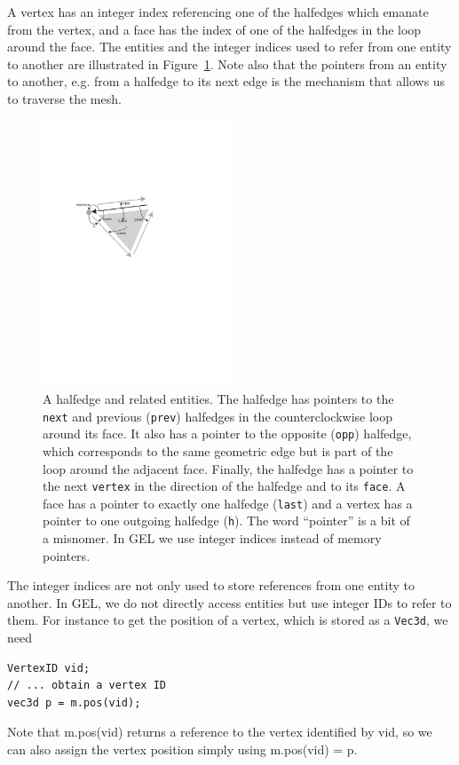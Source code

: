 \documentclass[a4paper]{article}
\begin{document}
A vertex has an integer index referencing one of the halfedges which emanate from the vertex, and a face has the index of one of the halfedges in the loop around the face. The entities and the integer indices used to refer from one entity to another are illustrated in Figure~\ref{fig:halfedge}. Note also that the pointers from an entity to another, e.g. from a halfedge to its next edge is the mechanism that allows us to traverse the mesh.
\begin{figure}[h!]
\centering
\includegraphics[width=0.5\textwidth]{halfedge-entities.pdf}
\caption{A halfedge and related entities. The halfedge has pointers to the \texttt{next} and previous (\texttt{prev}) halfedges in the counterclockwise loop around its face. It also has a pointer to the opposite (\texttt{opp}) halfedge, which corresponds to the same geometric edge but is part of the loop around the adjacent face. Finally, the halfedge has a pointer to the next \texttt{vertex} in the direction of the halfedge and to its \texttt{face}. A face has a pointer to exactly one halfedge (\texttt{last}) and a vertex has a pointer to one outgoing halfedge (\texttt{h}). The word ``pointer'' is a bit of a misnomer. In GEL we use integer indices instead of memory pointers. }
\label{fig:halfedge}
\end{figure}

The integer indices are not only used to store references from one entity to another. In GEL, we do not directly access entities but use integer IDs to refer to them. For instance to get the position of a vertex, which is stored as a \texttt{Vec3d}, we need
\begin{verbatim}
VertexID vid;
// ... obtain a vertex ID
vec3d p = m.pos(vid);
\end{verbatim}
Note that m.pos(vid) returns a reference to the vertex identified by vid, so we can also assign the vertex position simply using m.pos(vid) = p.
\end{document}
